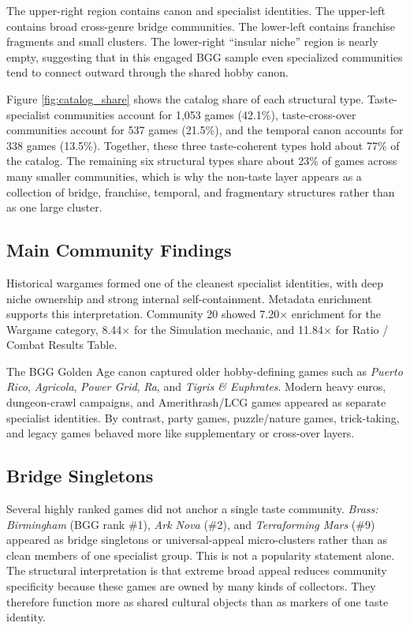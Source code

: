 \documentclass[10pt,twocolumn]{article}
\begin{document}
The upper-right region contains canon and specialist identities. The upper-left contains broad cross-genre bridge communities. The lower-left contains franchise fragments and small clusters. The lower-right ``insular niche'' region is nearly empty, suggesting that in this engaged BGG sample even specialized communities tend to connect outward through the shared hobby canon.

Figure \ref{fig:catalog_share} shows the catalog share of each structural type. Taste-specialist communities account for 1,053 games (42.1\%), taste-cross-over communities account for 537 games (21.5\%), and the temporal canon accounts for 338 games (13.5\%). Together, these three taste-coherent types hold about 77\% of the catalog. The remaining six structural types share about 23\% of games across many smaller communities, which is why the non-taste layer appears as a collection of bridge, franchise, temporal, and fragmentary structures rather than as one large cluster.

\subsection{Main Community Findings}

Historical wargames formed one of the cleanest specialist identities, with deep niche ownership and strong internal self-containment. Metadata enrichment supports this interpretation. Community 20 showed 7.20$\times$ enrichment for the Wargame category, 8.44$\times$ for the Simulation mechanic, and 11.84$\times$ for Ratio / Combat Results Table.

The BGG Golden Age canon captured older hobby-defining games such as \emph{Puerto Rico}, \emph{Agricola}, \emph{Power Grid}, \emph{Ra}, and \emph{Tigris \& Euphrates}. Modern heavy euros, dungeon-crawl campaigns, and Amerithrash/LCG games appeared as separate specialist identities. By contrast, party games, puzzle/nature games, trick-taking, and legacy games behaved more like supplementary or cross-over layers.

\subsection{Bridge Singletons}

Several highly ranked games did not anchor a single taste community. \emph{Brass: Birmingham} (BGG rank \#1), \emph{Ark Nova} (\#2), and \emph{Terraforming Mars} (\#9) appeared as bridge singletons or universal-appeal micro-clusters rather than as clean members of one specialist group. This is not a popularity statement alone. The structural interpretation is that extreme broad appeal reduces community specificity because these games are owned by many kinds of collectors. They therefore function more as shared cultural objects than as markers of one taste identity.
\end{document}
